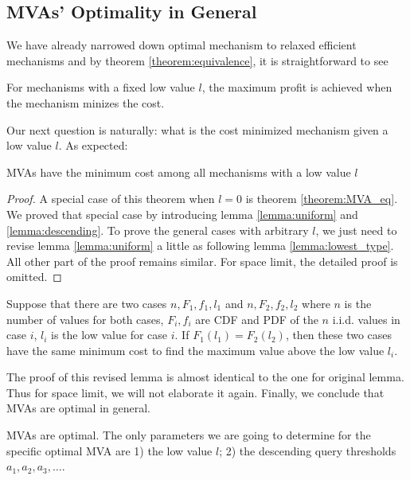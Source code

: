 \subsection{MVAs' Optimality in General}

We have already narrowed down optimal mechanism to
relaxed efficient mechanisms and by theorem \ref{theorem:equivalence},
it is straightforward to see

\begin{corollary}

For mechanisms with a fixed low value $l$, the maximum profit is
achieved when the mechanism minizes the cost.

\end{corollary}

Our next question is naturally: what is the cost minimized mechanism
given a low value $l$. As expected:

\begin{theorem}

MVAs have the minimum cost among all mechanisms with a low value $l$

\end{theorem}

\begin{proof}
A special case of this theorem when $l = 0$ is theorem \ref{theorem:MVA_eq}.
We proved that special case by introducing lemma \ref{lemma:uniform} and
\ref{lemma:descending}. To prove the general cases with arbitrary $l$, we just
need to revise lemma \ref{lemma:uniform} a little as following lemma
\ref{lemma:lowest_type}. All other part of the proof remains similar. For space
limit, the detailed proof is omitted.
\end{proof}

\begin{lemma}\label{lemma:lowest_type}
Suppose that there are two cases $n, F_1, f_1, l_1$ and $n, F_2, f_2, l_2$
where $n$ is the number of values for both cases, $F_i, f_i$ are CDF and PDF
of the $n$ i.i.d. values in case $i$, $l_i$ is the low value for case $i$.
If $F_1(l_1) = F_2(l_2)$, then these two cases have the same minimum cost
to find the maximum value above the low value $l_i$.
\end{lemma}

The proof of this revised lemma is almost identical to the one for original
lemma. Thus for space limit, we will not elaborate it again. Finally, we conclude
that MVAs are optimal in general.

\begin{corollary}

MVAs are optimal. The only parameters we are going to determine for the
specific optimal MVA are 1) the low value $l$; 2) the descending query
thresholds $a_1, a_2, a_3, \ldots$.

\end{corollary}

